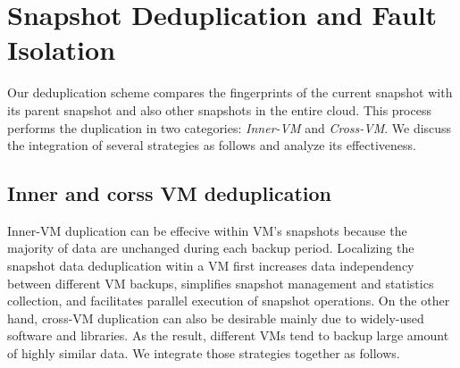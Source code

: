 \section{Snapshot Deduplication and Fault Isolation}
\label{sect:dedupe}


Our  deduplication scheme compares the fingerprints of the current snapshot
with its parent snapshot and also other snapshots in the entire cloud.
This process performs   the duplication in two categories: \textit{Inner-VM} and \textit{Cross-VM}. 
We discuss the integration of several strategies as follows and analyze its effectiveness.

\subsection{Inner and corss VM deduplication}

Inner-VM duplication can be effecive within  VM's snapshots because the majority of data are unchanged during each backup period. 
Localizing the snapshot data deduplication witin  a VM first
increases data independency between different VM backups,
simplifies snapshot management and statistics collection,
and facilitates parallel execution of snapshot operations.
On the other hand, cross-VM duplication can also be desirable mainly due to widely-used software and libraries. 
As the result, different VMs tend to backup large amount of highly similar data.
We integrate those strategies together as follows.

